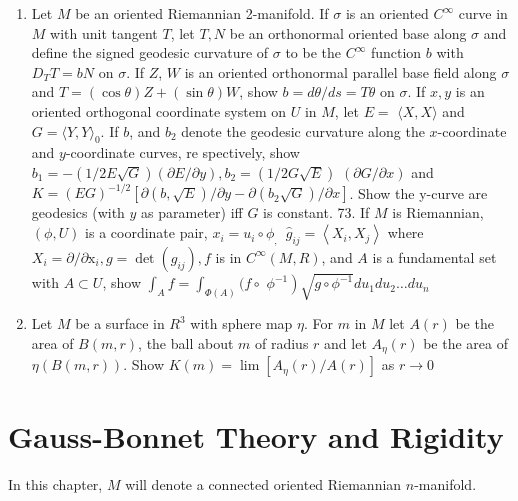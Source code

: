 \documentclass[10pt]{article}
\begin{document}
\begin{enumerate}
  \item Let $M$ be an oriented Riemannian 2-manifold. If $\sigma$ is an oriented $C^{\infty}$ curve in $M$ with unit tangent $T$, let $T, N$ be an orthonormal oriented base along $\sigma$ and define the signed geodesic curvature of $\sigma$ to be the $C^{\infty}$ function $b$ with $D_{T} T=b N$ on $\sigma$. If $Z$, $W$ is an oriented orthonormal parallel base field along $\sigma$ and $T=(\cos \theta) Z+(\sin \theta) W$, show $b=d \theta / d s=T \theta$ on $\sigma .$ If $x, y$ is an oriented orthogonal coordinate system on $U$ in $M$, let $E=$ $\langle X, X\rangle$ and $G=\langle Y, Y\rangle_{0}$. If $b$, and $b_{2}$ denote the geodesic curvature along the $x$-coordinate and $y$-coordinate curves, re spectively, show $b_{1}=-(1 / 2 E \sqrt{G})(\partial E / \partial y), b_{2}=(1 / 2 G \sqrt{E})$ $(\partial G / \partial x)$ and $K=(E G)^{-1 / 2}\left[\partial(b, \sqrt{E}) / \partial y-\partial\left(b_{2} \sqrt{G}\right) / \partial x\right]$. Show the y-curve are geodesics (with $y$ as parameter) iff $G$ is constant. 73. If $M$ is Riemannian, $(\phi, U)$ is a coordinate pair, $x_{i}=u_{i} \circ \phi_{\text {, }}$ $\hat{g}_{i j}=\left\langle X_{i}, X_{j}\right\rangle$ where $X_{i}=\partial / \partial \mathrm{x}_{i}, g=\operatorname{det}\left(g_{i j}\right), f$ is in $C^{\infty}(M, R)$, and $A$ is a fundamental set with $A \subset U$, show $\int_{A} f=\int_{\Phi(A)}(f \circ$ $\left.\phi^{-1}\right) \sqrt{g \circ \phi^{-1}} d u_{1} d u_{2} \ldots d u_{n}$

  \item Let $M$ be a surface in $R^{3}$ with sphere map $\eta$. For $m$ in $M$ let $A(r)$ be the area of $B(m, r)$, the ball about $m$ of radius $r$ and let $A_{\eta}(r)$ be the area of $\eta(B(m, r))$. Show $K(m)=\lim \left[A_{\eta}(r) / A(r)\right]$ as $r \rightarrow 0$

\end{enumerate}
\section{Gauss-Bonnet Theory and Rigidity}
In this chapter, $M$ will denote a connected oriented Riemannian $n$-manifold.
\end{document}
